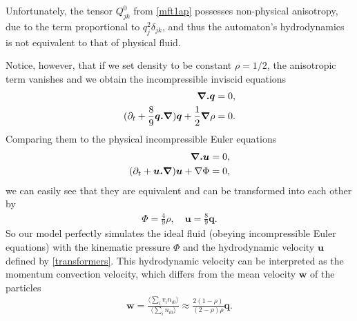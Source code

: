 
Unfortunately, the tensor $Q_{jk}^0$ from \ref{mft1ap} possesses non-physical anisotropy, due to the term proportional to $q^2_j \delta_{jk}$, and thus the automaton's hydrodynamics is not equivalent to that of physical fluid.

Notice, however, that if we set density to be constant $\rho = 1/2$, the anisotropic term vanishes and we obtain the incompressible inviscid equations
\begin{align}
\begin{split}
\bm{\nabla . q} &= 0, \\ 
(\partial_t + \frac{8}{9}\bm{q.\nabla})\bm{q} + \frac{1}{2} \bm{\nabla} \rho &= 0.
\end{split}
\end{align}
Comparing them to the physical incompressible Euler equations
\begin{align} \label{ideal_phys}
\begin{split}
\bm{\nabla . u} &= 0, \\
(\partial_t + \bm{u.\nabla})\bm{u} + \nabla \Phi &= 0,
\end{split}
\end{align}
we can easily see that they are equivalent and can be transformed into each other by
\begin{align} \label{transformers}
\Phi = \frac{4}{9} \rho, \quad \bm{u} = \frac{8}{9} \bm{q}.
\end{align}
So our model perfectly simulates the ideal fluid (obeying incompressible Euler equations) with the kinematic pressure $\Phi$ and the hydrodynamic velocity $\bm{u}$ defined by \ref{transformers}.
This hydrodynamic velocity can be interpreted as the momentum convection velocity, which differs from the mean velocity $\bm{w}$ of the particles
\begin{align}
\bm{w} = \frac{\langle \sum_i v_i n_{i0} \rangle}{\langle \sum_i n_{i0} \rangle} \approx \frac{2(1-\rho)}{(2 - \rho) \rho}\bm{q}.
\end{align}
%

